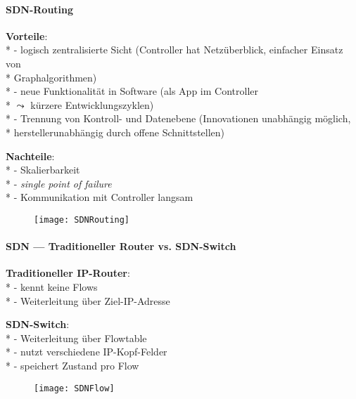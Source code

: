\paragraph{SDN-Routing}
\begin{items}
  \item \textbf{Vorteile}: \\*
    - logisch zentralisierte Sicht (Controller hat Netzüberblick, einfacher Einsatz von \\* \phantom{-} \phantom{\( \cdot \)} Graphalgorithmen) \\*
    - neue Funktionalität in Software (als App im Controller \\* \phantom{-} \phantom{\( \cdot \)} \( \leadsto \) kürzere Entwicklungszyklen) \\*
    - Trennung von Kontroll- und Datenebene (Innovationen unabhängig möglich, \\* \phantom{-} \phantom{\( \cdot \)} herstellerunabhängig durch offene Schnittstellen)
  \item \textbf{Nachteile}: \\*
    - Skalierbarkeit \\*
    - \emph{single point of failure} \\*
    - Kommunikation mit Controller langsam
\end{items}
\begin{figure}[H]\centering\label{SDNRouting}\texttt{[image: SDNRouting]}\end{figure}

\paragraph{SDN --- Traditioneller Router vs. SDN-Switch}
\begin{items}
  \item \textbf{Traditioneller IP-Router}: \\*
    - kennt keine Flows \\*
    - Weiterleitung über Ziel-IP-Adresse
  \item \textbf{SDN-Switch}: \\*
    - Weiterleitung über Flowtable \\*
    - nutzt verschiedene IP-Kopf-Felder \\*
    - speichert Zustand pro Flow
\end{items}
\begin{figure}[H]\centering\label{SDNFlow}\texttt{[image: SDNFlow]}\end{figure}